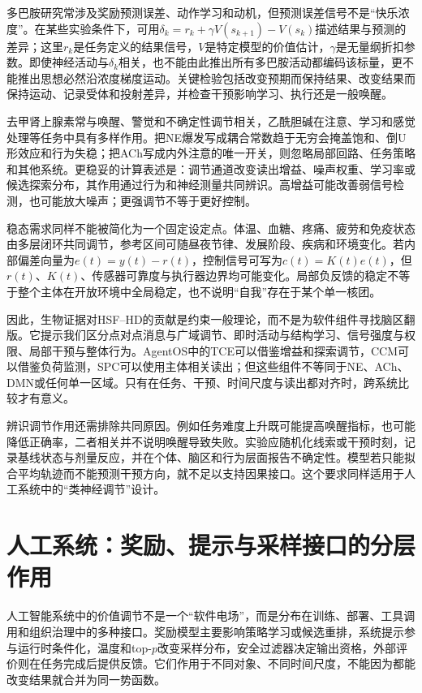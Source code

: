 多巴胺研究常涉及奖励预测误差、动作学习和动机，但预测误差信号不是“快乐浓度”。在某些实验条件下，可用$\delta_k=r_k+\gamma V(s_{k+1})-V(s_k)$描述结果与预测的差异；这里$r_k$是任务定义的结果信号，$V$是特定模型的价值估计，$\gamma$是无量纲折扣参数。即使神经活动与$\delta_k$相关，也不能由此推出所有多巴胺活动都编码该标量，更不能推出思想必然沿浓度梯度运动。关键检验包括改变预期而保持结果、改变结果而保持运动、记录受体和投射差异，并检查干预影响学习、执行还是一般唤醒。

去甲肾上腺素常与唤醒、警觉和不确定性调节相关，乙酰胆碱在注意、学习和感觉处理等任务中具有多样作用。把NE爆发写成耦合常数趋于无穷会掩盖饱和、倒U形效应和行为失稳；把ACh写成内外注意的唯一开关，则忽略局部回路、任务策略和其他系统。更稳妥的计算表述是：调节通道改变读出增益、噪声权重、学习率或候选探索分布，其作用通过行为和神经测量共同辨识。高增益可能改善弱信号检测，也可能放大噪声；更强调节不等于更好控制。

稳态需求同样不能被简化为一个固定设定点。体温、血糖、疼痛、疲劳和免疫状态由多层闭环共同调节，参考区间可随昼夜节律、发展阶段、疾病和环境变化。若内部偏差向量为$e(t)=y(t)-r(t)$，控制信号可写为$c(t)=K(t)e(t)$，但$r(t)$、$K(t)$、传感器可靠度与执行器边界均可能变化。局部负反馈的稳定不等于整个主体在开放环境中全局稳定，也不说明“自我”存在于某个单一核团。

因此，生物证据对HSF--HD的贡献是约束一般理论，而不是为软件组件寻找脑区翻版。它提示我们区分点对点消息与广域调节、即时活动与结构学习、信号强度与权限、局部干预与整体行为。AgentOS中的TCE可以借鉴增益和探索调节，CCM可以借鉴负荷监测，SPC可以使用主体相关读出；但这些组件不等同于NE、ACh、DMN或任何单一区域。只有在任务、干预、时间尺度与读出都对齐时，跨系统比较才有意义。

辨识调节作用还需排除共同原因。例如任务难度上升既可能提高唤醒指标，也可能降低正确率，二者相关并不说明唤醒导致失败。实验应随机化线索或干预时刻，记录基线状态与剂量反应，并在个体、脑区和行为层面报告不确定性。模型若只能拟合平均轨迹而不能预测干预方向，就不足以支持因果接口。这个要求同样适用于人工系统中的“类神经调节”设计。

\section{人工系统：奖励、提示与采样接口的分层作用}
\label{sec:silicon_gauge_source}

人工智能系统中的价值调节不是一个“软件电场”，而是分布在训练、部署、工具调用和组织治理中的多种接口。奖励模型主要影响策略学习或候选重排，系统提示参与运行时条件化，温度和top-$p$改变采样分布，安全过滤器决定输出资格，外部评价则在任务完成后提供反馈。它们作用于不同对象、不同时间尺度，不能因为都能改变结果就合并为同一势函数。

